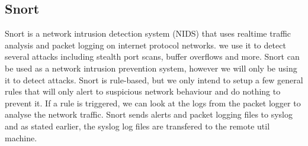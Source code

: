 \documentclass[11pt]{article} %
\begin{document}
\subsection{Snort}
Snort is a network intrusion detection system (NIDS) that uses realtime traffic analysis and packet logging on internet protocol networks.
we use it to detect several attacks including stealth port scans, buffer overflows and more. Snort can be used as a network intrusion prevention system, however we will only be using it to detect attacks.
Snort is rule-based, but we only intend to setup a few general rules that will only alert to suspicious network behaviour and do nothing to prevent it. 
If a rule is triggered, we can look at the logs from the packet logger to analyse the network traffic.
Snort sends alerts and packet logging files to syslog and as stated earlier, the syslog log files are transfered to the remote util machine.





\end{document}
